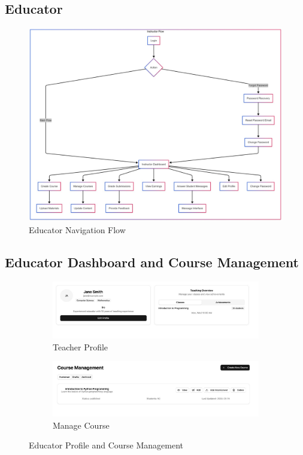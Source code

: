 \documentclass[a4paper, 11pt]{scrreprt}
\begin{document}
\subsection{Educator}
\vspace{1em}
\begin{figure}[H] %
    \centering
    \includegraphics[height=0.3\textheight]{UI/eduFlow.jpg}
    \caption{Educator Navigation Flow}
\end{figure}


\subsection{Educator Dashboard and Course Management}
\begin{figure}[H]
    \centering
    \begin{subfigure}[b]{0.38\textwidth}
        \centering
        \includegraphics[width=\textwidth]{UI/TeacherProfile.jpg}
        \caption{Teacher Profile}
    \end{subfigure}
    \hfill
    \begin{subfigure}[b]{0.38\textwidth}
        \centering
        \includegraphics[width=\textwidth]{UI/TeacherManageCourse.jpg}
        \caption{Manage Course}
    \end{subfigure}
    \caption{Educator Profile and Course Management}
\end{figure}
\end{document}
